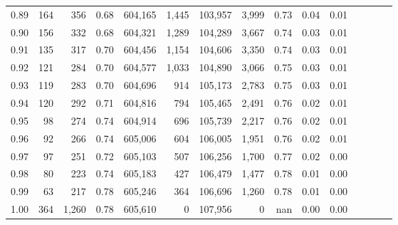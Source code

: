 \begin{tabular}{rrrcrrrrrrrrrrr}
0.89 &     164 &    356 &                                       0.68 &  604,165 &    1,445 &  103,957 &    3,999 &  0.73 &  0.04 &                         0.01 \\
0.90 &     156 &    332 &                                       0.68 &  604,321 &    1,289 &  104,289 &    3,667 &  0.74 &  0.03 &                         0.01 \\
0.91 &     135 &    317 &                                       0.70 &  604,456 &    1,154 &  104,606 &    3,350 &  0.74 &  0.03 &                         0.01 \\
0.92 &     121 &    284 &                                       0.70 &  604,577 &    1,033 &  104,890 &    3,066 &  0.75 &  0.03 &                         0.01 \\
0.93 &     119 &    283 &                                       0.70 &  604,696 &      914 &  105,173 &    2,783 &  0.75 &  0.03 &                         0.01 \\
0.94 &     120 &    292 &                                       0.71 &  604,816 &      794 &  105,465 &    2,491 &  0.76 &  0.02 &                         0.01 \\
0.95 &      98 &    274 &                                       0.74 &  604,914 &      696 &  105,739 &    2,217 &  0.76 &  0.02 &                         0.01 \\
0.96 &      92 &    266 &                                       0.74 &  605,006 &      604 &  106,005 &    1,951 &  0.76 &  0.02 &                         0.01 \\
0.97 &      97 &    251 &                                       0.72 &  605,103 &      507 &  106,256 &    1,700 &  0.77 &  0.02 &                         0.00 \\
0.98 &      80 &    223 &                                       0.74 &  605,183 &      427 &  106,479 &    1,477 &  0.78 &  0.01 &                         0.00 \\
0.99 &      63 &    217 &                                       0.78 &  605,246 &      364 &  106,696 &    1,260 &  0.78 &  0.01 &                         0.00 \\
1.00 &     364 &  1,260 &                                       0.78 &  605,610 &        0 &  107,956 &        0 &   nan &  0.00 &                         0.00 \\
\bottomrule
\end{tabular}

